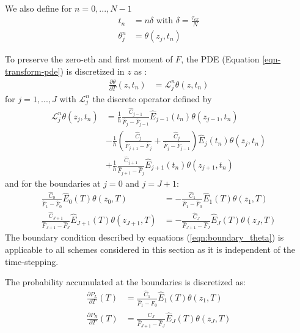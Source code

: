 \documentclass[]{rAMF2e}
\begin{document}
We also define for $n=0,...,N-1$
\begin{align}
t_n &= n \delta \text{ with } \delta = \frac{\tau_{ex}}{N} \\
\theta_j^n &= \theta(z_j,t_n)
\end{align}

To preserve the zero-eth and first moment of $F$, the PDE (Equation \ref{eqn-transform-pde}) is discretized in $z$ as \citep{hagan2013change}:
\begin{align}
\frac{\partial \theta}{\partial T}(z, t_n) &= \mathcal{L}_{j}^n \theta(z, t_n)
\end{align}
for $j=1,...,J$ with $\mathcal{L}_{j}^n$ the discrete operator defined by
\begin{align}
  \mathcal{L}_{j}^n\theta(z_j, t_n) &= \frac{1}{h} \frac{\hat{C}_{j-1}}{\hat{F}_{j}-\hat{F}_{j-1}}\hat{E}_{j-1}(t_n)\theta(z_{j-1},t_n)\\
  &-\frac{1}{h}\left(\frac{\hat{C}_{j}}{\hat{F}_{j+1}-\hat{F}_j}+\frac{\hat{C}_{j}}{\hat{F}_{j}-\hat{F}_{j-1}}\right)\hat{E}_{j}(t_n)\theta(z_j,t_n)\\
  &+\frac{1}{h}\frac{\hat{C}_{j+1}}{\hat{F}_{j+1}-\hat{F}_j}\hat{E}_{j+1}(t_n)\theta(z_{j+1},t_n)
\end{align}
and for the boundaries at $j=0$ and $j=J+1$:
\begin{subequations}\label{eqn:boundary_theta}
\begin{align}
\frac{\hat{C}_0}{\hat{F}_1-\hat{F}_0}\hat{E}_0(T) \theta(z_0,T) &= - \frac{\hat{C}_1}{\hat{F}_1-\hat{F}_0}\hat{E}_1(T) \theta(z_1,T) \\
\frac{\hat{C}_{J+1}}{\hat{F}_{J+1}-\hat{F}_J}\hat{E}_{J+1}(T) \theta(z_{J+1},T) &= - \frac{\hat{C}_J}{\hat{F}_{J+1}-\hat{F}_{J}}\hat{E}_J(T) \theta(z_J,T)
\end{align}
\end{subequations}
The boundary condition described by equations (\ref{eqn:boundary_theta}) is applicable to all schemes considered in this section as it is independent of the time-stepping.

The probability accumulated at the boundaries is discretized as:
\begin{align}
\frac{\partial P_L}{\partial T} (T) &= \frac{\hat{C}_1}{\hat{F}_1-\hat{F}_0}\hat{E}_1(T)\theta(z_1, T) \\
\frac{\partial P_R}{\partial T} (T) &= \frac{\hat{C}_J}{\hat{F}_{J+1}-\hat{F}_J}\hat{E}_J(T)\theta(z_J, T) 
\end{align}
\end{document}
